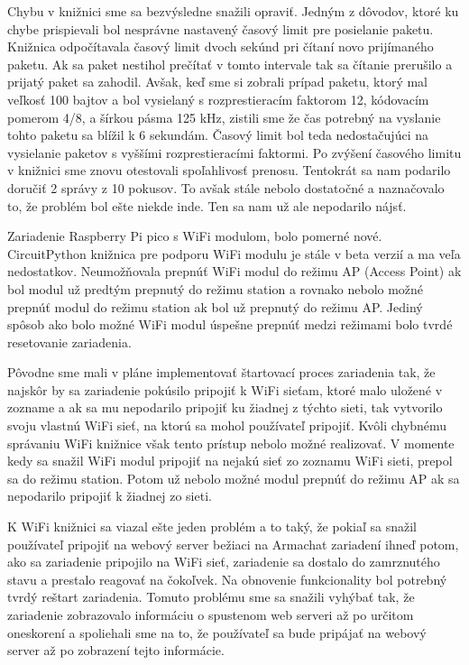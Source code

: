 \documentclass[slovak,master]{diploma}
\begin{document}
Chybu v knižnici sme sa bezvýsledne snažili opraviť. Jedným z dôvodov, ktoré ku chybe prispievali bol nesprávne nastavený časový limit pre posielanie paketu. Knižnica odpočítavala časový limit dvoch sekúnd 
pri čítaní novo prijímaného paketu. Ak sa paket nestihol prečítať v tomto intervale tak sa čítanie prerušilo a prijatý paket sa zahodil. 
Avšak, keď sme si zobrali prípad paketu, ktorý mal veľkosť 100 bajtov a bol vysielaný s rozprestieracím faktorom 12, kódovacím pomerom 4/8, a šírkou pásma 125 kHz, zistili sme 
že čas potrebný na vyslanie tohto paketu sa blížil k 6 sekundám. Časový limit bol teda nedostačujúci na vysielanie paketov s vyššími rozprestieracími faktormi. Po 
zvýšení časového limitu v knižnici sme znovu otestovali spoľahlivosť prenosu. Tentokrát sa nam podarilo doručiť 2 správy z 10 pokusov. To avšak stále nebolo dostatočné a 
naznačovalo to, že problém bol ešte niekde inde. Ten sa nam už ale nepodarilo nájsť.

Zariadenie Raspberry Pi pico s WiFi modulom, bolo pomerné nové. CircuitPython knižnica pre podporu WiFi modulu je stále v beta verzií a ma veľa nedostatkov.
Neumožňovala prepnúť WiFi modul do režimu AP (Access Point) ak bol modul už predtým prepnutý do režimu station a rovnako nebolo možné prepnúť modul do režimu station ak bol 
už prepnutý do režimu AP. Jediný spôsob ako bolo možné WiFi modul úspešne prepnúť medzi režimami bolo tvrdé resetovanie zariadenia. 

Pôvodne sme mali v pláne implementovať štartovací proces zariadenia tak, že najskôr by sa zariadenie pokúsilo pripojiť k WiFi sieťam, ktoré malo uložené v zozname a ak sa mu nepodarilo 
pripojiť ku žiadnej z týchto sieti, tak vytvorilo svoju vlastnú WiFi sieť, na ktorú sa mohol používateľ pripojiť. Kvôli chybnému správaniu WiFi knižnice však tento prístup nebolo možné 
realizovať. V momente kedy sa snažil WiFi modul pripojiť na nejakú sieť zo zoznamu WiFi sieti, prepol sa do režimu station. Potom už nebolo možné modul prepnúť do režimu AP ak sa nepodarilo pripojiť 
k žiadnej zo sieti.

K WiFi knižnici sa viazal ešte jeden problém a to taký, že pokiaľ sa snažil používateľ pripojiť na webový server bežiaci na Armachat zariadení ihneď potom, ako sa zariadenie pripojilo na WiFi sieť, 
zariadenie sa dostalo do zamrznutého stavu a prestalo reagovať na čokoľvek. Na obnovenie funkcionality bol potrebný tvrdý reštart zariadenia. 
Tomuto problému sme sa snažili vyhýbať tak, že zariadenie zobrazovalo informáciu o spustenom web serveri až po určitom oneskorení a spoliehali sme na to, že používateľ 
sa bude pripájať na webový server až po zobrazení tejto informácie.
\end{document}
